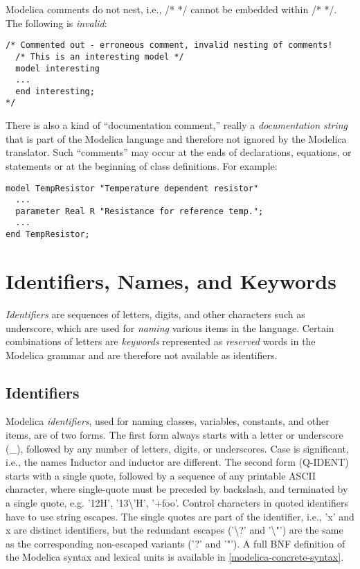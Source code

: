 Modelica comments do not nest, i.e., /* */ cannot be embedded within /*
*/. The following is \emph{invalid}:
\begin{lstlisting}[language=modelica]
/* Commented out - erroneous comment, invalid nesting of comments!
  /* This is an interesting model */
  model interesting
  ...
  end interesting;
*/
\end{lstlisting}

There is also a kind of ``documentation comment,'' really a
\emph{documentation string} that is part of the Modelica language and
therefore not ignored by the Modelica translator. Such ``comments'' may
occur at the ends of declarations, equations, or statements or at the
beginning of class definitions. For example:

\begin{lstlisting}[language=modelica]
model TempResistor "Temperature dependent resistor"
  ...
  parameter Real R "Resistance for reference temp.";
  ...
end TempResistor;
\end{lstlisting}

\section{Identifiers, Names, and Keywords}

\emph{Identifiers} are sequences of letters, digits, and other
characters such as underscore, which are used for \emph{naming} various
items in the language. Certain combinations of letters are
\emph{keywords} represented as \emph{reserved} words in the Modelica
grammar and are therefore not available as identifiers.

\subsection{Identifiers}

Modelica \emph{identifiers}, used for naming classes, variables,
constants, and other items, are of two forms. The first form always
starts with a letter or underscore (\_), followed by any number of
letters, digits, or underscores. Case is significant, i.e., the names
Inductor and inductor are different. The second form (Q-IDENT) starts
with a single quote, followed by a sequence of any printable ASCII
character, where single-quote must be preceded by backslash, and
terminated by a single quote, e.g. '12H', '13\textbackslash{}'H',
'+foo'. Control characters in quoted identifiers have to use string
escapes. The single quotes are part of the identifier, i.e., 'x' and x
are distinct identifiers, but the redundant escapes ('\textbackslash{}?'
and '\textbackslash{}"') are the same as the corresponding non-escaped
variants ('?' and '"'). A full BNF definition of the Modelica syntax and
lexical units is available in \ref{modelica-concrete-syntax}.

